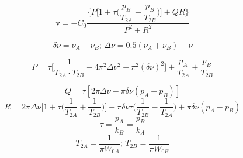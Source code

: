 \documentclass{article}
\begin{document}
\begin{equation}
\textrm{v} = -C_0\frac{\bigg\{P\bigg[1+\tau\Big(\dfrac{p_B}{T_{2A}}+\dfrac{p_B}{T_{2B}}\Big)\bigg]+Q R\bigg\}}{P^2+R^2}
\end{equation}

\begin{equation}
\delta \nu = \nu_A-\nu_B \mbox{; } \Delta \nu = 0.5(\nu_A+\nu_B)-\nu
\end{equation}

\begin{equation}
P=\tau\bigg[\frac{1}{T_{2A} \cdot T_{2B}}-4\pi^2\Delta\nu^2+\pi^2(\delta\nu)^2\bigg]+\frac{p_A}{T_{2A}}+\frac{p_B}{T_{2B}}
\end{equation}

\begin{equation}
Q=\tau[2\pi\Delta\nu-\pi\delta\nu(p_A-p_B)]
\end{equation}
\begin{equation}
R=2\pi\Delta\nu\bigg[1+\tau\Big(\frac{1}{T_{2A}}+\frac{1}{T_{2B}}\Big)\bigg]+\pi\delta\nu\tau\Big(\frac{1}{T_{2B}}-\frac{1}{T_{2A}}\Big)+\pi\delta\nu(p_A-p_B)
\end{equation}
\begin{equation}
\tau=\frac{p_A}{k_B}=\frac{p_B}{k_A}
\end{equation}
\begin{equation}
T_{2A}=\dfrac{1}{\pi W_{0A}}\mbox{; } T_{2B}=\dfrac{1}{\pi W_{0B}}
\end{equation}
\end{document}
